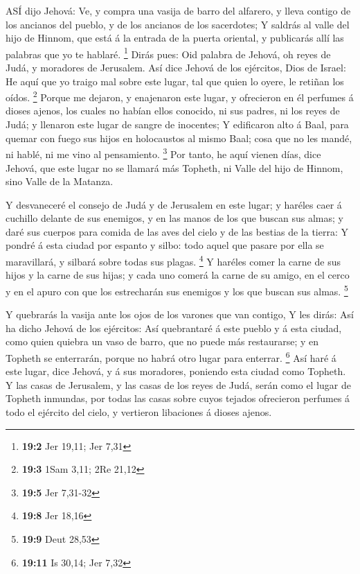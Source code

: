  ASÍ dijo Jehová: Ve, y compra una vasija de barro del
alfarero, y lleva contigo de los ancianos del pueblo, y de los ancianos
de los sacerdotes;  Y saldrás al valle del hijo de Hinnom,
que está á la entrada de la puerta oriental, y publicarás allí las
palabras que yo te hablaré. \footnote{\textbf{19:2} Jer 19,11; Jer 7,31}
 Dirás pues: Oid palabra de Jehová, oh reyes de Judá, y
moradores de Jerusalem. Así dice Jehová de los ejércitos, Dios de
Israel: He aquí que yo traigo mal sobre este lugar, tal que quien lo
oyere, le retiñan los oídos. \footnote{\textbf{19:3} 1Sam 3,11; 2Re
  21,12}  Porque me dejaron, y enajenaron este lugar, y
ofrecieron en él perfumes á dioses ajenos, los cuales no habían ellos
conocido, ni sus padres, ni los reyes de Judá; y llenaron este lugar de
sangre de inocentes;  Y edificaron alto á Baal, para quemar
con fuego sus hijos en holocaustos al mismo Baal; cosa que no les mandé,
ni hablé, ni me vino al pensamiento. \footnote{\textbf{19:5} Jer 7,31-32}
 Por tanto, he aquí vienen días, dice Jehová, que este lugar
no se llamará más Topheth, ni Valle del hijo de Hinnom, sino Valle de la
Matanza.

 Y desvaneceré el consejo de Judá y de Jerusalem en este
lugar; y haréles caer á cuchillo delante de sus enemigos, y en las manos
de los que buscan sus almas; y daré sus cuerpos para comida de las aves
del cielo y de las bestias de la tierra:  Y pondré á esta
ciudad por espanto y silbo: todo aquel que pasare por ella se
maravillará, y silbará sobre todas sus plagas. \footnote{\textbf{19:8}
  Jer 18,16}  Y haréles comer la carne de sus hijos y la
carne de sus hijas; y cada uno comerá la carne de su amigo, en el cerco
y en el apuro con que los estrecharán sus enemigos y los que buscan sus
almas. \footnote{\textbf{19:9} Deut 28,53}

 Y quebrarás la vasija ante los ojos de los varones que van
contigo,  Y les dirás: Así ha dicho Jehová de los
ejércitos: Así quebrantaré á este pueblo y á esta ciudad, como quien
quiebra un vaso de barro, que no puede más restaurarse; y en Topheth se
enterrarán, porque no habrá otro lugar para enterrar. \footnote{\textbf{19:11}
  Is 30,14; Jer 7,32}  Así haré á este lugar, dice Jehová,
y á sus moradores, poniendo esta ciudad como Topheth.  Y
las casas de Jerusalem, y las casas de los reyes de Judá, serán como el
lugar de Topheth inmundas, por todas las casas sobre cuyos tejados
ofrecieron perfumes á todo el ejército del cielo, y vertieron libaciones
á dioses ajenos.

